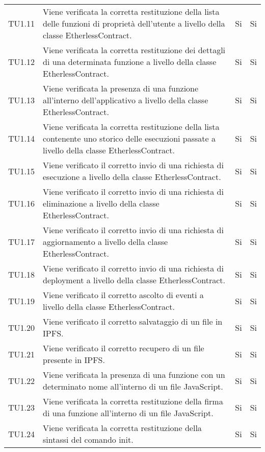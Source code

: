 \begin{longtable}{
		>{\centering}p{}
		>{}p{}
		>{\centering}p{}
		>{\centering}p{} }
		TU1.11 &
		Viene verificata la corretta restituzione della lista delle funzioni di proprietà dell’utente a livello della classe EtherlessContract. &
		Si &
		Si \tabularnewline

		TU1.12 &
		Viene verificata la corretta restituzione dei dettagli di una determinata funzione a livello della classe EtherlessContract. &
		Si &
		Si \tabularnewline

		TU1.13 &
		Viene verificata la presenza di una funzione all’interno dell’applicativo a livello della classe EtherlessContract. &
		Si &
		Si \tabularnewline

		TU1.14 &
		Viene verificata la corretta restituzione della lista contenente uno storico delle esecuzioni passate a livello della classe EtherlessContract. &
		Si &
		Si \tabularnewline

		TU1.15 &
		Viene verificato il corretto invio di una richiesta di esecuzione a livello della classe EtherlessContract. &
		Si &
		Si \tabularnewline

		TU1.16 &
		Viene verificato il corretto invio di una richiesta di eliminazione a livello della classe EtherlessContract. &
		Si &
		Si \tabularnewline

		TU1.17 &
		Viene verificato il corretto invio di una richiesta di aggiornamento a livello della classe EtherlessContract. &
		Si &
		Si \tabularnewline

		TU1.18 &
		Viene verificato il corretto invio di una richiesta di deployment\ped{\textit{G}} a livello della classe EtherlessContract. &
		Si &
		Si \tabularnewline

		TU1.19 &
		Viene verificato il corretto ascolto di eventi\ped{\textit{G}} a livello della classe EtherlessContract. &
		Si &
		Si \tabularnewline

		TU1.20 &
		Viene verificato il corretto salvataggio di un file in IPFS\ped{\textit{G}}. &
		Si &
		Si \tabularnewline

		TU1.21 &
		Viene verificato il corretto recupero di un file presente in IPFS\ped{\textit{G}}. &
		Si &
		Si \tabularnewline

		TU1.22 &
		Viene verificata la presenza di una funzione con un determinato nome all’interno di un file JavaScript\ped{\textit{G}}. &
		Si &
		Si \tabularnewline

		TU1.23 &
		Viene verificata la corretta restituzione della firma di una funzione all’interno di un file JavaScript\ped{\textit{G}}. &
		Si &
		Si \tabularnewline

		TU1.24 &
		Viene verificata la corretta restituzione della sintassi del comando init. &
		Si &
		Si \tabularnewline


\end{longtable}
